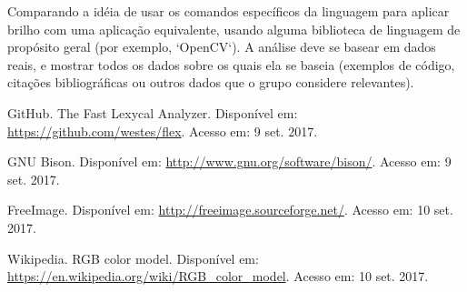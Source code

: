 \documentclass[a4paper, 10pt, conference]{ieeeconf}
\begin{document}
Comparando a idéia de usar os comandos específicos da linguagem para aplicar brilho com uma aplicação equivalente, usando alguma biblioteca de linguagem de propósito geral (por exemplo, `OpenCV`). A análise deve se basear em dados reais, e mostrar todos os dados sobre os quais ela se baseia (exemplos de código, citações bibliográficas ou outros dados que o grupo considere relevantes).

\begin{thebibliography}{99}

 GitHub. The Fast Lexycal Analyzer. Disponível em: \url{https://github.com/westes/flex}. Acesso em: 9 set. 2017. 

 GNU Bison. Disponível em: \url{http://www.gnu.org/software/bison/}. Acesso em: 9 set. 2017.

 FreeImage. Disponível em: \url{http://freeimage.sourceforge.net/}. Acesso em: 10 set. 2017.

 Wikipedia. RGB color model. Disponível em: \url{https://en.wikipedia.org/wiki/RGB_color_model}. Acesso em: 10 set. 2017.

\end{thebibliography}
\end{document}
